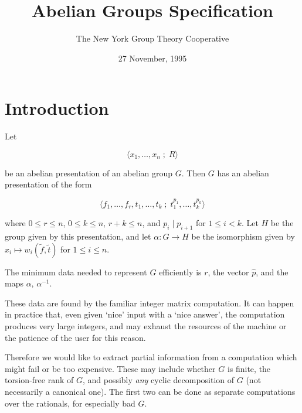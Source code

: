 
\title{Abelian Groups Specification}
\author{The New York Group Theory Cooperative}
\date{27 November, 1995}






\maketitle


\section{Introduction}

Let

$$\langle x_1,\dots, x_n\;;\; R \rangle$$

\noindent be an abelian presentation of an abelian group $G$. Then $G$ has an
abelian presentation of the form

$$\langle f_1,\dots, f_r, t_1,\dots, t_k\;;\; t_1^{p_1},\dots, t_k^{p_k}\rangle$$

\noindent where $0\le r\le n$, $0\le k\le n$, $r+k\le n$, and $p_i\mid
p_{i+1}$ for $1\le i<k$. Let $H$ be the group given by this
presentation, and let $\alpha:G\to H$ be the isomorphism given by
$x_i\mapsto w_i(\tilde{f},\tilde{t})$ for $1\le i\le n$.

\lskip

The minimum data needed to represent $G$ efficiently is $r$, the
vector $\hat{p}$, and the maps $\alpha$, $\alpha^{-1}$.

These data are found by the familiar integer matrix computation. It
can happen in practice that, even given `nice' input with a `nice
answer', the computation produces very large integers, and may exhaust
the resources of the machine or the patience of the user for this
reason.

Therefore we would like to extract partial information from a
computation which might fail or be too expensive. These may include
whether $G$ is finite, the torsion-free rank of $G$, and possibly {\em
any} cyclic decomposition of $G$ (not necessarily a canonical
one). The first two can be done as separate computations over the
rationals, for especially bad $G$.


